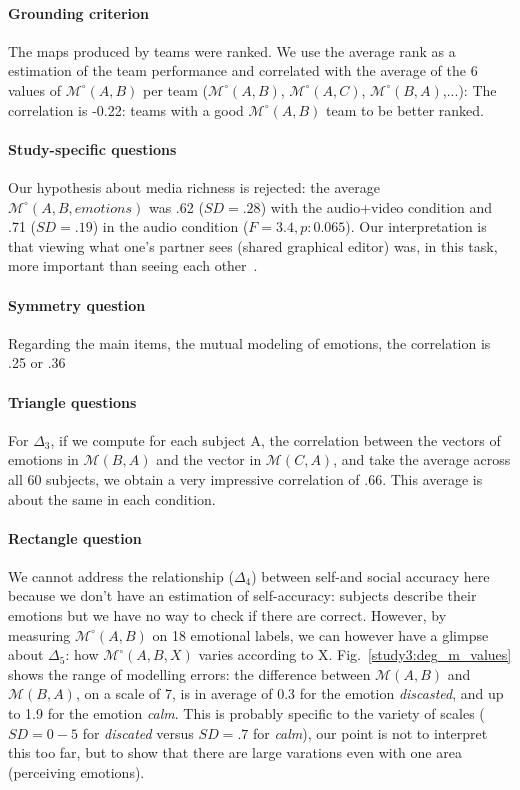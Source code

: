 \documentclass[twocolumn]{article}
\newcommand{\gmodel}[2]{{$\mathcal{M}(#1, #2)$}}
\newcommand{\Model}[3]{{$\mathcal{M}^{\circ}(#1, #2, #3)$}}
\newcommand{\gModel}[2]{{$\mathcal{M}^{\circ}(#1, #2)$}}
\begin{document}
\paragraph{Grounding criterion} The maps produced by teams were ranked. We use
the average rank as a estimation of the team performance and correlated with the
average of the 6 values of \gModel{A}{B} per team (\gModel{A}{B}, \gModel{A}{C},
\gModel{B}{A},...): The correlation is -0.22: teams with a good \gModel{A}{B}
team to be better ranked. 

\paragraph{Study-specific questions} Our hypothesis about media richness is
rejected: the average \Model{A}{B}{emotions} was .62 ($SD = .28$) with the
audio+video condition and .71 ($SD = .19$) in the audio condition ($F=3.4, p:
0.065$). Our interpretation is that viewing what one's partner sees (shared
graphical editor) was, in this task, more important than seeing each
other~\citep{gaver1993one}.

\paragraph{Symmetry question} Regarding the main items, the mutual modeling of
emotions, the correlation is .25 or .36  

\paragraph{Triangle questions}  For $\Delta_3$, if we
compute for each subject A, the correlation between the vectors of emotions in
\gmodel{B}{A} and the vector in \gmodel{C}{A}, and take the average across all
60 subjects, we obtain a very impressive correlation of .66. This average is
about the same in each condition.

\paragraph{Rectangle question} We cannot address the relationship ($\Delta_4$)
between self-and social accuracy here because we don't have an estimation of
self-accuracy: subjects describe their emotions but we have no way to check if
there are correct. However, by measuring \gModel{A}{B} on  18 emotional labels,
we can however have a glimpse about $\Delta_5$: how \Model{A}{B}{X} varies
according to X.  Fig.~\ref{study3:deg_m_values} shows the range of modelling
errors: the difference between \gmodel{A}{B} and \gmodel{B}{A}, on a scale of 7,
is in average of 0.3 for the emotion \emph{discasted}, and up to 1.9 for the
emotion \emph{calm}. This is probably specific to the variety of scales  ($SD=
0-5$ for \emph{discated} versus $SD=.7$ for \emph{calm}), our point is not to
interpret this too far, but to show that there are large varations even with one
area  (perceiving emotions). 
\end{document}
